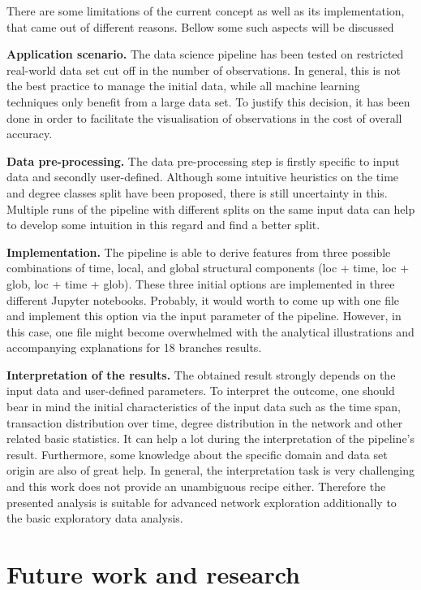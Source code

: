 There are some limitations of the current concept as well as its implementation, that came out of different reasons. Bellow some such aspects will be discussed 

\textbf{Application scenario.}
The data science pipeline has been tested on restricted real-world data set cut off in the number of observations. In general, this is not the best practice to manage the initial data, while all machine learning techniques only benefit from a large data set. To justify this decision, it has been done in order to facilitate the visualisation of observations in the cost of overall accuracy. 

\textbf{Data pre-processing.}
The data pre-processing step is firstly specific to input data and secondly user-defined. Although some intuitive heuristics on the time and degree classes split have been proposed, there is still uncertainty in this. Multiple runs of the pipeline with different splits on the same input data can help to develop some intuition in this regard and find a better split.

\textbf{Implementation.}
The pipeline is able to derive features from three possible combinations of time, local, and global structural components (loc + time, loc + glob, loc + time + glob). These three initial options are implemented in three different Jupyter notebooks. Probably, it would worth to come up with one file and implement this option via the input parameter of the pipeline. However, in this case, one file might become overwhelmed with the analytical illustrations and accompanying explanations for 18 branches results.

\textbf{Interpretation of the results.}
The obtained result strongly depends on the input data and user-defined parameters. To interpret the outcome, one should bear in mind the initial characteristics of the input data such as the time span, transaction distribution over time, degree distribution in the network and other related basic statistics. It can help a lot during the interpretation of the pipeline's result. Furthermore, some knowledge about the specific domain and data set origin are also of great help. In general, the interpretation task is very challenging and this work does not provide an unambiguous recipe either. Therefore the presented analysis is suitable for advanced network exploration additionally to the basic exploratory data analysis.

\section{Future work and research}

